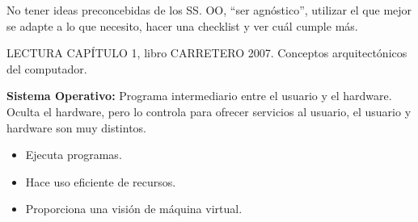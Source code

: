 \documentclass[12pt, twoside, openright]{report} %
\begin{document}
  No tener ideas preconcebidas de los SS. OO, ``ser agnóstico'',
  utilizar el que mejor se adapte a lo que necesito, hacer una checklist
  y ver cuál cumple más.
  
  
  LECTURA CAPÍTULO 1, libro CARRETERO 2007. Conceptos arquitectónicos
  del computador.
  
  
  \textbf{Sistema Operativo:} Programa intermediario entre el usuario y
  el hardware. Oculta el hardware, pero lo controla para ofrecer
  servicios al usuario, el usuario y hardware son muy distintos.
  

  \begin{itemize}
  \item Ejecuta programas.
    
  \item Hace uso eficiente de recursos.
    
  \item Proporciona una visión de máquina virtual.
    
  \end{itemize}
\pagebreak
\end{document}
